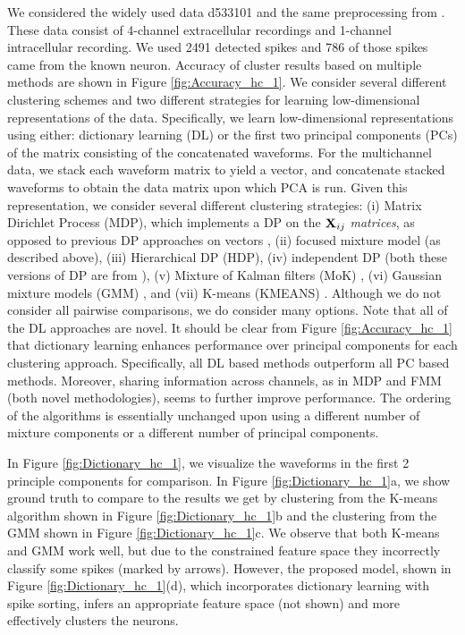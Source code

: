 \documentclass[journal]{IEEEtran}
\begin{document}
We considered
the widely used data d533101 and the same
preprocessing from \cite{Calabrese2010}.
  These data consist of 4-channel extracellular recordings and 1-channel
  intracellular recording.  We used 2491 detected spikes and 786 of those
  spikes came from the known neuron. Accuracy of cluster results based on multiple methods are shown in Figure \ref{fig:Accuracy_hc_1}. 
We consider several different clustering schemes and two different strategies for learning low-dimensional representations of the data.  Specifically, we learn low-dimensional representations using either: dictionary learning (DL) or the first two principal components (PCs) of the matrix consisting of the concatenated waveforms.  For the multichannel data, we stack each waveform matrix to yield a vector, and concatenate stacked waveforms to obtain the data matrix upon which PCA is run.   Given this representation, we consider several different clustering strategies: (i) Matrix Dirichlet Process (MDP), which implements a DP on the ${\mathbf X}_{ij}$ \emph{matrices}, as opposed to previous DP approaches on vectors \cite{Wood2009, Bo2011}, (ii) focused mixture model (as described above), (iii) Hierarchical DP (HDP), (iv) independent DP (both these versions of DP are from \cite{Bo2011}), (v) Mixture of Kalman filters (MoK) \cite{Calabrese2010}, (vi) Gaussian mixture models (GMM) \cite{bishop2006}, and (vii) K-means (KMEANS) \cite{Lewicki}.  Although we do not consider all pairwise comparisons, we do consider many options.  Note that all of the DL approaches are novel.  
It should be clear from Figure \ref{fig:Accuracy_hc_1} that dictionary learning enhances performance over principal components for each clustering approach. Specifically, all DL based methods outperform all PC based methods.
Moreover, sharing information across channels, as in MDP and FMM (both novel methodologies), seems to further improve performance.   The ordering of the algorithms is essentially unchanged upon using a different number of mixture components or a different number of principal components.  

In Figure \ref{fig:Dictionary_hc_1}, we visualize the waveforms in the first 2 principle components for comparison.  In Figure \ref{fig:Dictionary_hc_1}a, we show ground truth to compare to the results we get by clustering from the K-means algorithm shown in Figure \ref{fig:Dictionary_hc_1}b and the clustering from the GMM shown in  Figure \ref{fig:Dictionary_hc_1}c.  We observe that both K-means and GMM work well, but due to the constrained feature space they incorrectly classify some spikes (marked by arrows). However, the proposed model, shown in Figure  \ref{fig:Dictionary_hc_1}(d), which incorporates dictionary learning with spike sorting, infers an appropriate feature space (not shown) and more effectively clusters the neurons.
\end{document}
